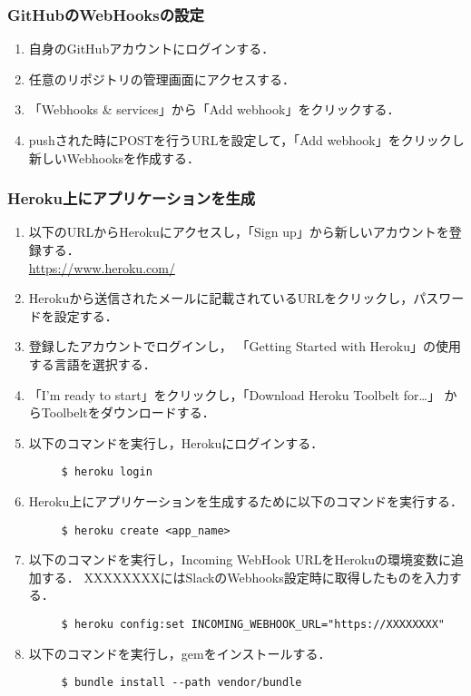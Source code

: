 \documentclass[fleqn, 14pt]{sty/extarticlej}
\begin{document}
\subsubsection{GitHubのWebHooksの設定}
\begin{enumerate}
  \item 自身のGitHubアカウントにログインする．

  \item 任意のリポジトリの管理画面にアクセスする．

  \item 「Webhooks \& services」から「Add webhook」をクリックする．

  \item pushされた時にPOSTを行うURLを設定して，「Add webhook」をクリックし
    新しいWebhooksを作成する．
\end{enumerate}

\subsubsection{Heroku上にアプリケーションを生成}
\begin{enumerate}
\item 以下のURLからHerokuにアクセスし，「Sign up」から新しいアカウントを登録する．\\
   \url{https://www.heroku.com/}

\item Herokuから送信されたメールに記載されているURLをクリックし，パスワードを設定する．

\item 登録したアカウントでログインし，
  「Getting Started with Heroku」の使用する言語を選択する．

\item 「I'm ready to start」をクリックし，「Download Heroku Toolbelt for…」
  からToolbeltをダウンロードする．
  
\item 以下のコマンドを実行し，Herokuにログインする．
\begin{verbatim}
     $ heroku login
\end{verbatim}

\item Heroku上にアプリケーションを生成するために以下のコマンドを実行する．
\begin{verbatim}
     $ heroku create <app_name>
\end{verbatim}

\item 以下のコマンドを実行し，Incoming WebHook URLをHerokuの環境変数に追加する．
  XXXXXXXXにはSlackのWebhooks設定時に取得したものを入力する．
\begin{verbatim}
     $ heroku config:set INCOMING_WEBHOOK_URL="https://XXXXXXXX"
\end{verbatim}

\item 以下のコマンドを実行し，gemをインストールする．
\begin{verbatim}
     $ bundle install --path vendor/bundle
\end{verbatim}

\end{enumerate}
\end{document}
